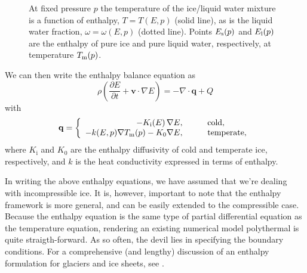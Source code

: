 \documentclass[parskip=half]{scrartcl}
\newcommand{\bq}{\mathbf{q}}
\newcommand{\bv}{\mathbf{v}}
\newcommand{\ddt}[1]{\ensuremath{\frac{\partial #1}{\partial t}}}
\newcommand{\Div}{\nabla\cdot}
\newcommand{\grad}{\nabla}
\begin{document}
\begin{figure} \centering{  }
  \caption{At fixed pressure $p$ the temperature of the ice/liquid
water mixture is a function of enthalpy, $T=T(E,p)$ (solid line), as
is the liquid water fraction, $\omega=\omega(E,p)$ (dotted line).
Points $E_{\text s}(p)$ and $E_{\text l}(p)$ are the enthalpy of pure
ice and pure liquid water, respectively, at temperature $T_{\text
m}(p)$.}
  \label{fig:enthalpy-function}
\end{figure}

We can then write the enthalpy balance equation as
\begin{equation}
  \label{eq:energy-balance} \rho \left(\ddt{E} + \bv \cdot \grad
E\right) = - \Div \bq + Q
\end{equation} with
\begin{equation}\label{eq:enthalpy-flux} {\mathbf q} = \left\{
    \begin{array}{rl} - K_{\text i}(E)\, \nabla E, & \qquad
\mathrm{cold},\\ - k(E,p) \nabla T_{\text m}(p) - K_0 \nabla E, & \qquad
\mathrm{temperate},
    \end{array} \right.
\end{equation} where $K_{\mathrm{i}}$ and $K_0$ are the enthalpy
diffusivity of cold and temperate ice, respectively, and $k$ is the
heat conductivity expressed in terms of enthalpy.

In writing the above enthalpy equations, we have assumed that we're
dealing with incompressible ice. It is, however, important to note
that the enthalpy framework is more general, and can be easily
extended to the compressible case.  Because the enthalpy equation is
the same type of partial differential equation as the temperature
equation, rendering an existing numerical model polythermal is quite
straigth-forward. As so often, the devil lies in specifying the
boundary conditions. For a comprehensive (and lengthy) discussion of
an enthalpy formulation for glaciers and ice sheets, see
\cite{Aschwanden2012}.


\newpage 
\end{document}
